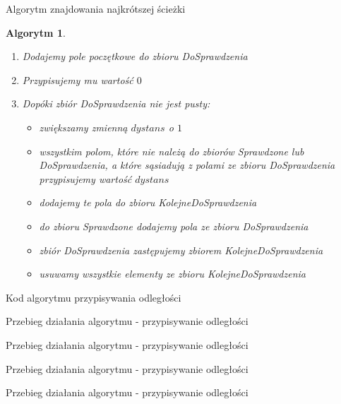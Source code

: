 \documentclass[a4paper,10pt]{beamer}
\newtheorem{alg}{Algorytm}[subsection]
\begin{document}
		\begin{frame}{Algorytm znajdowania najkrótszej ścieżki}
			\begin{alg}
				\begin{enumerate}
					\item Dodajemy pole poczętkowe do zbioru DoSprawdzenia
					\item Przypisujemy mu wartość $0$
					\item Dopóki zbiór DoSprawdzenia nie jest pusty:
					\begin{itemize}
						\item zwiększamy zmienną $dystans$ o $1$
						\item wszystkim polom, które nie należą do zbiorów Sprawdzone lub DoSprawdzenia, a które sąsiadują z polami ze zbioru DoSprawdzenia przypisujemy wartość $dystans$
						\item dodajemy te pola do zbioru KolejneDoSprawdzenia
						\item do zbioru Sprawdzone dodajemy pola ze zbioru DoSprawdzenia
						\item zbiór DoSprawdzenia zastępujemy zbiorem KolejneDoSprawdzenia
						\item usuwamy wszystkie elementy ze zbioru KolejneDoSprawdzenia
					\end{itemize}
				\end{enumerate}
			\end{alg}
		\end{frame}
		\begin{frame}{Kod algorytmu przypisywania odległości}
		\end{frame}
		\begin{frame}{Przebieg działania algorytmu - przypisywanie odległości}
		\end{frame}
		\begin{frame}{Przebieg działania algorytmu - przypisywanie odległości}
		\end{frame}
		\begin{frame}{Przebieg działania algorytmu - przypisywanie odległości}
		\end{frame}
		\begin{frame}{Przebieg działania algorytmu - przypisywanie odległości}
		\end{frame}
\end{document}
